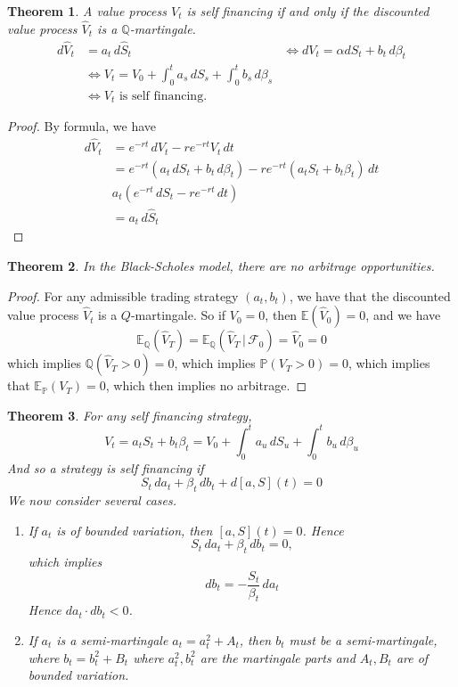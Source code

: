 \documentclass[10pt, oneside, reqno]{amsart}
\theoremstyle{plain}%
\newtheorem{thm}{Theorem}[section]
\theoremstyle{definition}
\theoremstyle{remark}
\newcommand{\given}{ \, | \,}
\newcommand{\Q}{\mathbb{Q}}
\renewcommand{\P}{\mathbb{P}}
\newcommand{\E}{\mathbb{E}}
\newcommand{\sigf}{\mathcal{F}}
\begin{document}
\begin{thm}
	A value process $V_t$ is self financing if and only if the discounted value process $\hat V_t$ is a $\Q$-martingale.
\begin{align*}
		d \hat V_t &= a_t \, d\hat S_t &\iff dV_t = \alpha dS_t + b_t \, d\beta_t \\
						&\iff V_t = V_0 + \int_0^t a_s \, dS_s + \int_0^t b_s \, d\beta_s \\
						&\iff \text{$V_t$ is self financing.  }
\end{align*}
\end{thm}

\begin{proof}
	By \itos formula, we have \begin{align*}
		d \hat V_t 	&= e^{-rt} \, d V_t - re^{-rt} V_t \, dt \\
					&= e^{-rt} \left( a_t \, dS_t + b_t \, d\beta_t \right) - re^{-rt} \left( a_t S_t + b_t \beta_t \right) \, dt \\
					& a_t (e^{-rt} \, dS_t - re^{-rt} \, dt) \\
					&= a_t \, d \hat S_t
	\end{align*} 
\end{proof}

\begin{thm}
	In the Black-Scholes model, there are no arbitrage opportunities.
\end{thm}

\begin{proof}
	For any admissible trading strategy $(a_t, b_t)$, we have that the discounted value process $\hat V_t$ is a $Q$-martingale.  So if $V_0 = 0$, then $\E(\hat V_0) = 0$, and we have \[
		\E_\Q(\hat V_T) = \E_\Q(\hat V_T \given \sigf_0) = \hat V_0 = 0
	\] which implies $\Q(\hat V_T > 0) = 0$, which implies $\P(V_T > 0) = 0$, which implies that $\E_\P(V_T) = 0$, which then implies no arbitrage.     
\end{proof}

\begin{thm}
	For any self financing strategy, \[
		V_t = a_t S_t + b_t \beta_t = V_0 + \int_0^t a_u \, dS_u + \int_0^t b_u \, d\beta_u
	\]  And so a strategy is self financing if \[
		S_t \, da_t + \beta_t \, db_t + d[a, S](t) = 0
	\]  We now consider several cases.
	\begin{enumerate}
		\item   If $a_t$ is of bounded variation, then $[a, S](t) = 0$.  Hence \[
			S_t \, da_t + \beta_t \, db_t = 0,
		\] which implies \[
			db_t = -\frac{S_t}{\beta_t} \, da_t
		\]  Hence $da_t \cdot db_t < 0$.  
		\item If $a_t$ is a semi-martingale $a_t = a_t^2 + A_t$, then $b_t$ must be a semi-martingale, where $b_t = b_t^2 + B_t$ where $a_t^2, b_t^2$ are the martingale parts and $A_t, B_t$ are of bounded variation.
	\end{enumerate}
\end{thm}
\end{document}

